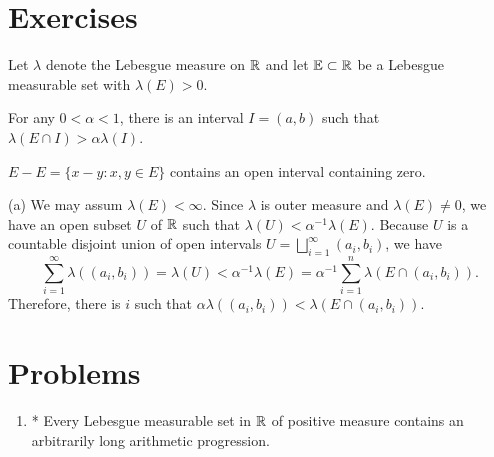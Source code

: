 \documentclass{../../large}
\begin{document}
\begin{prb}
\end{prb}

\begin{prb}
\end{prb}


\section*{Exercises}

\begin{prb}
Let $\lambda$ denote the Lebesgue measure on $\mathbb{R}$ and let $\mathbb{E}\subset\mathbb{R}$ be a Lebesgue measurable set with $\lambda(E)>0$.
\begin{parts}
\item For any $0<\alpha<1$, there is an interval $I=(a,b)$ such that $\lambda(E\cap I)>\alpha\lambda(I)$.
\item $E-E=\{x-y:x,y\in E\}$ contains an open interval containing zero.
\end{parts}
\begin{pf}
(a)
We may assum $\lambda(E)<\infty$.
Since $\lambda$ is outer measure and $\lambda(E)\ne0$, we have an open subset $U$ of $\mathbb{R}$ such that $\lambda(U)<\alpha^{-1}\lambda(E)$.
Because $U$ is a countable disjoint union of open intervals $U=\bigsqcup_{i=1}^\infty(a_i,b_i)$, we have
\[\sum_{i=1}^\infty\lambda((a_i,b_i))=\lambda(U)<\alpha^{-1}\lambda(E)=\alpha^{-1}\sum_{i=1}^n\lambda(E\cap(a_i,b_i)).\]
Therefore, there is $i$ such that $\alpha\lambda((a_i,b_i))<\lambda(E\cap(a_i,b_i))$.
\end{pf}
\end{prb}




\section*{Problems}
\begin{enumerate}
\item* Every Lebesgue measurable set in $\mathbb{R}$ of positive measure contains an arbitrarily long arithmetic progression.
\end{enumerate}
\end{document}

